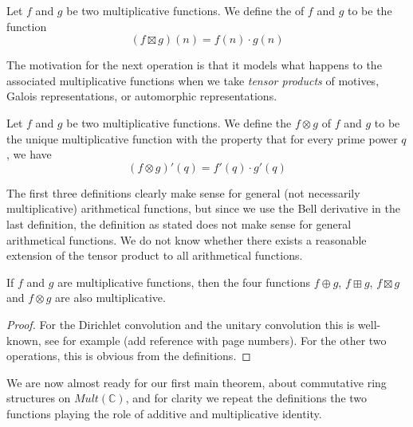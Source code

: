 \begin{definition}
Let $f$ and $g$ be two multiplicative functions. We define the  of $f$ and $g$ to be the function
$$ (f \boxtimes g)(n) = f(n) \cdot g(n)   $$
\end{definition}
The motivation for the next operation is that it models what happens to the associated multiplicative functions when we take \emph{tensor products} of motives, Galois representations, or automorphic representations.

\begin{definition}
Let $f$ and $g$ be two multiplicative functions. We define the  $f \otimes g$ of $f$ and $g$ to be the unique multiplicative function with the property that for every prime power $q$, we have
$$ (f \otimes g)'(q) = f'(q) \cdot g'(q)    $$
\end{definition}

\begin{remark}
The first three definitions clearly make sense for general (not necessarily multiplicative) arithmetical functions, but since we use the Bell derivative in the last definition, the definition as stated does not make sense for general arithmetical functions. We do not know whether there exists a reasonable extension of the tensor product to all arithmetical functions.
\end{remark}

\begin{proposition}
If $f$ and $g$ are multiplicative functions, then the four functions $f \oplus g$, $f \boxplus g$, $f \boxtimes g$ and $f \otimes g$ are also multiplicative. 
\end{proposition}

\begin{proof}
For the Dirichlet convolution and the unitary convolution this is well-known, see for example (add reference with page numbers). For the other two operations, this is obvious from the definitions.
\end{proof}

We are now almost ready for our first main theorem, about commutative ring structures on $Mult(\mathbb{C})$, and for clarity we repeat the definitions the two functions playing the role of additive and multiplicative identity.

